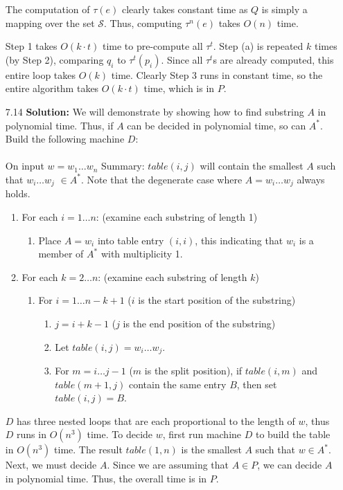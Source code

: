 \documentclass{article}
\begin{document}
\begin{enumerate}
    The computation of $\tau(e)$ clearly takes constant time as $Q$ is simply a
    mapping over the set $\mathcal{S}$.  Thus, computing $\tau^n(e)$ takes
    $O(n)$ time.

    Step 1 takes $O(k \cdot t)$ time to pre-compute all $\tau^t$.  Step (a) is
    repeated $k$ times (by Step 2), comparing $q_i$ to $\tau^t(p_i)$.  Since
    all $\tau^t$s are already computed, this entire loop takes $O(k)$ time.
    Clearly Step 3 runs in constant time, so the entire algorithm takes $O(k
    \cdot t)$ time, which is in $P$.

    \item[7.14] \textbf{Solution:}
    We will demonstrate by showing how to find substring $A$ in polynomial
    time. Thus, if $A$ can be decided in polynomial time, so can $A^{*}$.
    Build the following machine $D$: \\ \\
    On input $w = w_{1} \dots w_{n}$
    Summary: $table(i,j)$ will contain the smallest $A$ such that $w_{i}\dots w_{j}$
    $\in A^{*}$. Note that the degenerate case where $A = w_{i}\dots w_{j}$
    always holds.
    \begin{enumerate}
    \item For each $i = 1 \dots n$: (examine each substring of length 1)
    \begin{enumerate}
    \item Place $A=w_{i}$ into table entry $(i,i)$, this indicating that $w_{i}$ is
    a member of $A^{*}$ with multiplicity 1.
    \end{enumerate}
    \item For each $k = 2 \dots n$: (examine each substring of length $k$)
    \begin{enumerate}
    \item For $i = 1 \dots n - k + 1$ ($i$ is the start position of the substring)
    \begin{enumerate}
    \item $j = i + k - 1$ ($j$ is the end position of the substring)
    \item Let $table(i,j) = w_{i} \dots w_{j}$.
    \item For $m = i \dots j - 1$ ($m$ is the split position), if $table(i,m)$
    and $table (m+1, j)$ contain the same entry $B$, then set $table(i,j) = B$.
    \end{enumerate}
    \end{enumerate}
    \end{enumerate}
    $D$ has three nested loops that are each proportional to the length of $w$,
    thus $D$ runs in $O(n^{3})$ time.  To decide $w$, first run machine $D$ to
    build the table in $O(n^{3})$ time. The result $table(1,n)$ is the smallest
    $A$ such that $w \in A^{*}$.  Next, we must decide $A$. Since we are
    assuming that $A\in P$, we can decide $A$ in polynomial time. Thus, the
    overall time is in $P$. 
\end{enumerate}
\end{document}
